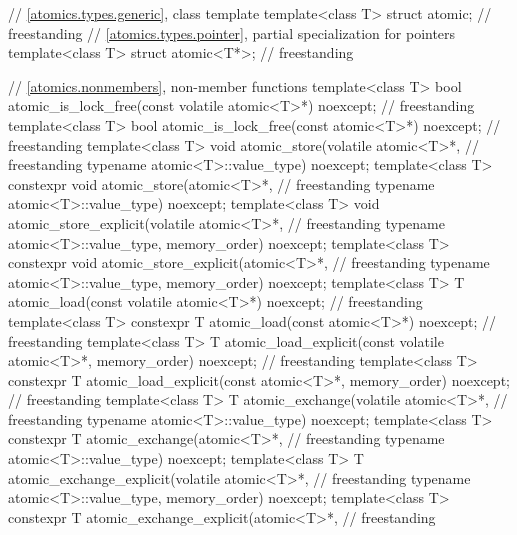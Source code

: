 \begin{codeblock}
{  // \ref{atomics.types.generic}, class template 
  template<class T> struct atomic;                                                  // freestanding
  // \ref{atomics.types.pointer}, partial specialization for pointers
  template<class T> struct atomic<T*>;                                              // freestanding

  // \ref{atomics.nonmembers}, non-member functions
  template<class T>
    bool atomic_is_lock_free(const volatile atomic<T>*) noexcept;                   // freestanding
  template<class T>
    bool atomic_is_lock_free(const atomic<T>*) noexcept;                            // freestanding
  template<class T>
    void atomic_store(volatile atomic<T>*,                                          // freestanding
                      typename atomic<T>::value_type) noexcept;
  template<class T>
    constexpr void atomic_store(atomic<T>*,                                         // freestanding
                                typename atomic<T>::value_type) noexcept;
  template<class T>
    void atomic_store_explicit(volatile atomic<T>*,                                 // freestanding
                               typename atomic<T>::value_type, memory_order) noexcept;
  template<class T>
    constexpr void atomic_store_explicit(atomic<T>*,                                // freestanding
                                         typename atomic<T>::value_type, memory_order) noexcept;
  template<class T>
    T atomic_load(const volatile atomic<T>*) noexcept;                              // freestanding
  template<class T>
    constexpr T atomic_load(const atomic<T>*) noexcept;                             // freestanding
  template<class T>
    T atomic_load_explicit(const volatile atomic<T>*, memory_order) noexcept;       // freestanding
  template<class T>
    constexpr T atomic_load_explicit(const atomic<T>*, memory_order) noexcept;      // freestanding
  template<class T>
    T atomic_exchange(volatile atomic<T>*,                                          // freestanding
                      typename atomic<T>::value_type) noexcept;
  template<class T>
    constexpr T atomic_exchange(atomic<T>*,                                         // freestanding
                                typename atomic<T>::value_type) noexcept;
  template<class T>
    T atomic_exchange_explicit(volatile atomic<T>*,                                 // freestanding
                               typename atomic<T>::value_type, memory_order) noexcept;
  template<class T>
    constexpr T atomic_exchange_explicit(atomic<T>*,                                // freestanding
}
\end{codeblock}
